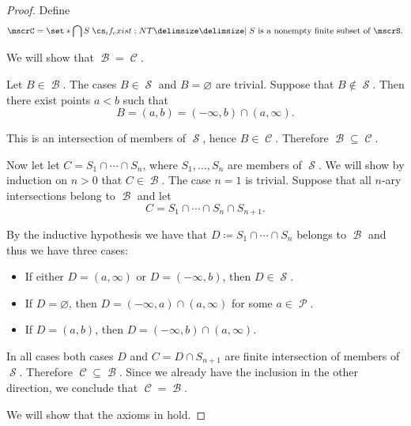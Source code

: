 \begin{proof}
   Define
  \begin{equation*}
    \mscrC = \set*{ \bigcap S \given* S \text{ is a nonempty finite subset of } \mscrS }.
  \end{equation*}

  We will show that \( \mscrB = \mscrC \).

  Let \( B \in \mscrB \). The cases \( B \in \mscrS \) and \( B = \varnothing \) are trivial. Suppose that \( B \not\in \mscrS \). Then there exist points \( a < b \) such that
  \begin{equation*}
    B = (a, b) = (-\infty, b) \cap (a, \infty).
  \end{equation*}

  This is an intersection of members of \( \mscrS \), hence \( B \in \mscrC \). Therefore \( \mscrB \subseteq \mscrC \).

  Now let let \( C = S_1 \cap \cdots \cap S_n \), where \( S_1, \ldots, S_n \) are members of \( \mscrS \). We will show by induction on \( n > 0 \) that \( C \in \mscrB \). The case \( n = 1 \) is trivial. Suppose that all \( n \)-ary intersections belong to \( \mscrB \) and let
  \begin{equation*}
    C = S_1 \cap \cdots \cap S_n \cap S_{n+1}.
  \end{equation*}

  By the inductive hypothesis we have that \( D \coloneqq S_1 \cap \cdots \cap S_n \) belongs to \( \mscrB \) and thus we have three cases:
  \begin{itemize}
    \item If either \( D = (a, \infty) \) or \( D = (-\infty, b) \), then \( D \in \mscrS \).
    \item If \( D = \varnothing \), then \( D = (-\infty, a) \cap (a, \infty) \) for some \( a \in \mscrP \).
    \item If \( D = (a, b) \), then \( D = (-\infty, b) \cap (a, \infty) \).
  \end{itemize}

  In all cases both cases \( D \) and \( C = D \cap S_{n+1} \) are finite intersection of members of \( \mscrS \). Therefore \( \mscrC \subseteq \mscrB \). Since we already have the inclusion in the other direction, we conclude that \( \mscrC = \mscrB \).

   We will show that the axioms in  hold.


\end{proof}
